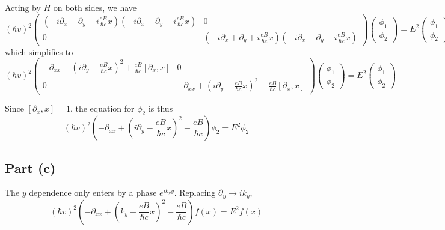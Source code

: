 \documentclass{article}
\begin{document}
Acting by $H$ on both sides, we have
\begin{equation*}
(\hbar v)^2\left(\begin{array}{cc}(-i\partial_x-\partial_y-i\frac{eB}{\hbar c}x)(-i\partial_x+\partial_y+i\frac{eB}{\hbar c}x)&0\\0&(-i\partial_x+\partial_y+i\frac{eB}{\hbar c}x)(-i\partial_x-\partial_y-i\frac{eB}{\hbar c}x)\end{array}\right)\left(\begin{array}{c}\phi_1\\ \phi_2\end{array}\right)=E^2\left(\begin{array}{c}\phi_1\\ \phi_2\end{array}\right)
\end{equation*}
which simplifies to
\begin{equation*}
(\hbar v)^2\left(\begin{array}{cc}-\partial_{xx}+(i\partial_y-\frac{eB}{\hbar c}x)^2+\frac{eB}{\hbar c}[\partial_x,x]&0\\0&-\partial_{xx}+(i\partial_y-\frac{eB}{\hbar c}x)^2-\frac{eB}{\hbar c}[\partial_x,x]\end{array}\right)\left(\begin{array}{c}\phi_1\\ \phi_2\end{array}\right)=E^2\left(\begin{array}{c}\phi_1\\ \phi_2\end{array}\right)
\end{equation*}

Since $[\partial_x,x]=1$, the equation for $\phi_2$ is thus
\begin{equation*}
(\hbar v)^2\left(-\partial_{xx}+\left(i\partial_y-\frac{eB}{\hbar c}x\right)^2-\frac{eB}{\hbar c}\right)\phi_2=E^2\phi_2
\end{equation*}

\subsection{Part (c)}
The $y$ dependence only enters by a phase $e^{ik_yy}$. Replacing $\partial_y\rightarrow ik_y$,
\begin{equation*}
(\hbar v)^2\left(-\partial_{xx}+\left(k_y+\frac{eB}{\hbar c}x\right)^2-\frac{eB}{\hbar c}\right)f(x)=E^2f(x)
\end{equation*}
\end{document}
